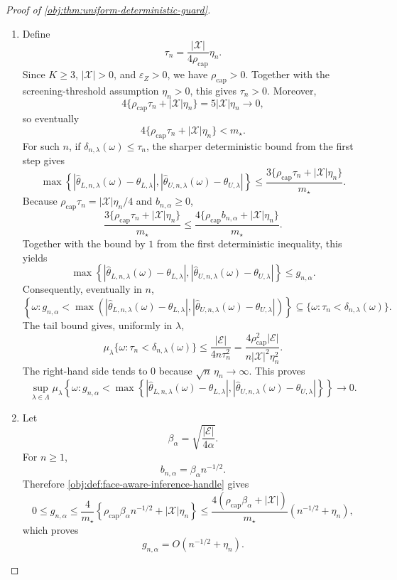 \documentclass[11pt]{article}
\begin{document}
\begin{proof}[Proof of \cref{obj:thm:uniform-deterministic-guard}]
\begin{enumerate}
\item Define
\[
\tau_n
=
\frac{|\mathcal X|}{4\rho_{\mathrm{cap}}}\eta_n .
\]
Since \(K\ge3\), \(|\mathcal X|>0\), and \(\varepsilon_Z>0\), we have
\(\rho_{\mathrm{cap}}>0\).  Together with the screening-threshold assumption
\(\eta_n>0\), this gives \(\tau_n>0\).  Moreover,
\[
4\{\rho_{\mathrm{cap}}\tau_n+|\mathcal X|\eta_n\}
=
5|\mathcal X|\eta_n
\longrightarrow 0,
\]
so eventually
\[
4\{\rho_{\mathrm{cap}}\tau_n+|\mathcal X|\eta_n\}<m_\star .
\]
For such \(n\), if
\(\delta_{n,\lambda}(\omega)\le\tau_n\), the sharper deterministic bound from
the first step gives
\[
\max\left\{
\left|\widehat\theta_{L,n,\lambda}(\omega)-\theta_{L,\lambda}\right|,
\left|\widehat\theta_{U,n,\lambda}(\omega)-\theta_{U,\lambda}\right|
\right\}
\le
\frac{3\{\rho_{\mathrm{cap}}\tau_n+|\mathcal X|\eta_n\}}{m_\star}.
\]
Because \(\rho_{\mathrm{cap}}\tau_n=|\mathcal X|\eta_n/4\) and
\(b_{n,\alpha}\ge0\),
\[
\frac{3\{\rho_{\mathrm{cap}}\tau_n+|\mathcal X|\eta_n\}}{m_\star}
\le
\frac{4\{\rho_{\mathrm{cap}}b_{n,\alpha}+|\mathcal X|\eta_n\}}{m_\star}.
\]
Together with the bound by \(1\) from the first deterministic inequality, this
yields
\[
\max\left\{
\left|\widehat\theta_{L,n,\lambda}(\omega)-\theta_{L,\lambda}\right|,
\left|\widehat\theta_{U,n,\lambda}(\omega)-\theta_{U,\lambda}\right|
\right\}
\le
g_{n,\alpha}.
\]
Consequently, eventually in \(n\),
\[
\left\{\omega:
g_{n,\alpha}
<
\max\left(
\left|\widehat\theta_{L,n,\lambda}(\omega)-\theta_{L,\lambda}\right|,
\left|\widehat\theta_{U,n,\lambda}(\omega)-\theta_{U,\lambda}\right|
\right)
\right\}
\subseteq
\{\omega:\tau_n<\delta_{n,\lambda}(\omega)\}.
\]
The tail bound gives, uniformly in \(\lambda\),
\[
\mu_\lambda\{\omega:\tau_n<\delta_{n,\lambda}(\omega)\}
\le
\frac{|\mathcal E|}{4n\tau_n^2}
=
\frac{4\rho_{\mathrm{cap}}^2|\mathcal E|}
{n|\mathcal X|^2\eta_n^2}.
\]
The right-hand side tends to \(0\) because
\(\sqrt n\,\eta_n\to\infty\).
This proves
\[
\sup_{\lambda\in\Lambda}
\mu_\lambda\!\left\{
\omega:
g_{n,\alpha}
<
\max\left\{
\left|\widehat\theta_{L,n,\lambda}(\omega)-\theta_{L,\lambda}\right|,
\left|\widehat\theta_{U,n,\lambda}(\omega)-\theta_{U,\lambda}\right|
\right\}
\right\}
\longrightarrow 0 .
\]

\item Let
\[
\beta_\alpha
=
\sqrt{\frac{|\mathcal E|}{4\alpha}} .
\]
For \(n\ge1\),
\[
b_{n,\alpha}=\beta_\alpha n^{-1/2}.
\]
Therefore \cref{obj:def:face-aware-inference-handle} gives
\[
0\le g_{n,\alpha}
\le
\frac{4}{m_\star}
\left\{
\rho_{\mathrm{cap}}\beta_\alpha n^{-1/2}
+
|\mathcal X|\eta_n
\right\}
\le
\frac{4(\rho_{\mathrm{cap}}\beta_\alpha+|\mathcal X|)}{m_\star}
\left(n^{-1/2}+\eta_n\right),
\]
which proves
\[
g_{n,\alpha}=O(n^{-1/2}+\eta_n).
\]


\end{enumerate}
\end{proof}
\end{document}
